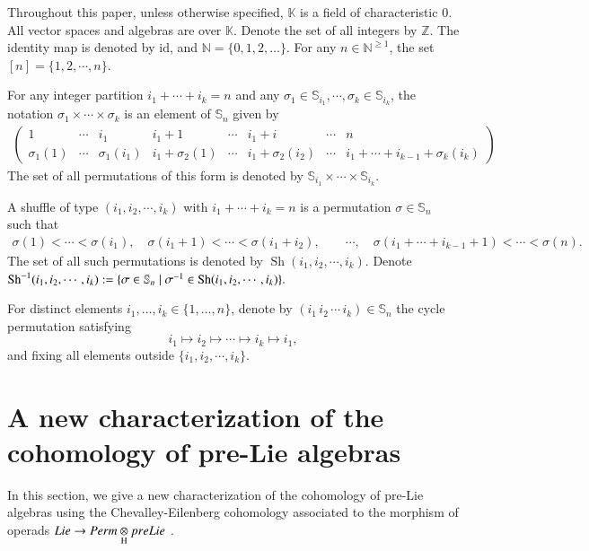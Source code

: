 \documentclass[12pt]{amsart}
\theoremstyle{definition}
\newcommand{\id}{\mathrm{id}}
\newcommand{\ot}{\otimes}
\newcommand{\s}{\mathbb{S}}
\newcommand{\Sh}{{\rm Sh}}
\newcommand{\dsN}{\mathds{N}}
\begin{document}
Throughout this paper, unless otherwise specified, $\mathds{K}$ is a field of characteristic $0$. All vector spaces and algebras are over $\mathds{K}$. Denote the set of all integers by $\mathds{Z}$.  The identity map is denoted by $\id$, and $\dsN=\{0,1,2,\ldots\}$. For any $n\in \mathds{N}^{\geq1}$, the set $[n]=\{1,2,\cdots,n\}$.

 For any integer partition $i_1+\cdots+i_k=n$ and any $\sigma_1\in \s_{i_1},\cdots, \sigma_k\in \s_{i_k}$, the notation $\sigma_1\times\cdots\times\sigma_k$ is an element of $\s_n$ given by
\small{
\begin{align}\label{def-aaaSn}
\begin{pmatrix}
1          &\cdots&i_1       & i_1+1           &\cdots& i_1+i              &\cdots    &n\\
\sigma_1(1)&\cdots&\sigma_1(i_1)& i_1+\sigma_2(1) &\cdots& i_1+\sigma_2(i_2) &\cdots    &i_1+\cdots+i_{k-1}+\sigma_{k}(i_k)
			\end{pmatrix}
\end{align}}
The set of all permutations of this form is denoted by $\mathbb{S}_{i_1}\times\cdots\times\mathbb{S}_{i_k}$.


A shuffle of type $(i_1, i_2, \cdots, i_k)$ with $i_1 + \cdots + i_k = n$ is a permutation $\sigma \in \mathbb{S}_n$ such that
\begin{align*}
	 \sigma(1)<\cdots<\sigma(i_1), \quad
	  \sigma(i_1+1)<\cdots<\sigma(i_1+i_2), \quad
	  \quad  \cdots,  \quad
	  \sigma(i_1+\cdots+i_{k-1}+1)<\cdots<\sigma(n).
\end{align*}
The set of all such permutations is denoted by $\operatorname{Sh}(i_1,i_2,\cdots,i_k)$. Denote $\Sh^{-1}(i_1,i_2,\cdots,i_k):=\{\sigma\in\s_n\mid\sigma^{-1}\in\Sh(i_1,i_2,\cdots,i_k)\}.$

For distinct elements $i_1,\ldots,i_k\in\{1,\ldots,n\}$, denote by
$(i_1\,i_2\,\cdots\,i_k)\in\s_n$ the cycle permutation satisfying
\[
i_1\mapsto i_2\mapsto\cdots\mapsto i_k\mapsto i_1,
\]
and fixing all elements outside $\{i_1,i_2,\cdots,i_k\}$.


\section{A new characterization of the cohomology of pre-Lie algebras}\label{sec:pL}
In this section, we give a new characterization of the cohomology of pre-Lie algebras using the Chevalley-Eilenberg cohomology associated to the morphism of operads  $Lie \to Perm\underset{\rm H}{\ot} preLie$ .
\end{document}
